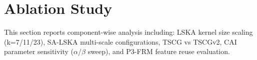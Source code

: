 \section{Ablation Study}
This section reports component-wise analysis including: LSKA kernel size scaling (k=7/11/23), SA-LSKA multi-scale configurations, TSCG vs TSCGv2, CAI parameter sensitivity ($\alpha$/$\beta$ sweep), and P3-FRM feature reuse evaluation.
